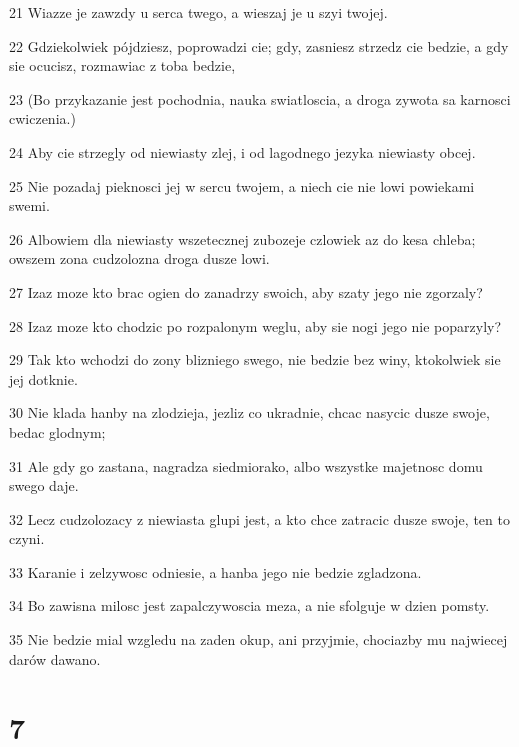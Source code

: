 \par 21 Wiazze je zawzdy u serca twego, a wieszaj je u szyi twojej.
\par 22 Gdziekolwiek pójdziesz, poprowadzi cie; gdy, zasniesz strzedz cie bedzie, a gdy sie ocucisz, rozmawiac z toba bedzie,
\par 23 (Bo przykazanie jest pochodnia, nauka swiatloscia, a droga zywota sa karnosci cwiczenia.)
\par 24 Aby cie strzegly od niewiasty zlej, i od lagodnego jezyka niewiasty obcej.
\par 25 Nie pozadaj pieknosci jej w sercu twojem, a niech cie nie lowi powiekami swemi.
\par 26 Albowiem dla niewiasty wszetecznej zubozeje czlowiek az do kesa chleba; owszem zona cudzolozna droga dusze lowi.
\par 27 Izaz moze kto brac ogien do zanadrzy swoich, aby szaty jego nie zgorzaly?
\par 28 Izaz moze kto chodzic po rozpalonym weglu, aby sie nogi jego nie poparzyly?
\par 29 Tak kto wchodzi do zony blizniego swego, nie bedzie bez winy, ktokolwiek sie jej dotknie.
\par 30 Nie klada hanby na zlodzieja, jezliz co ukradnie, chcac nasycic dusze swoje, bedac glodnym;
\par 31 Ale gdy go zastana, nagradza siedmiorako, albo wszystke majetnosc domu swego daje.
\par 32 Lecz cudzolozacy z niewiasta glupi jest, a kto chce zatracic dusze swoje, ten to czyni.
\par 33 Karanie i zelzywosc odniesie, a hanba jego nie bedzie zgladzona.
\par 34 Bo zawisna milosc jest zapalczywoscia meza, a nie sfolguje w dzien pomsty.
\par 35 Nie bedzie mial wzgledu na zaden okup, ani przyjmie, chociazby mu najwiecej darów dawano.

\chapter{7}

